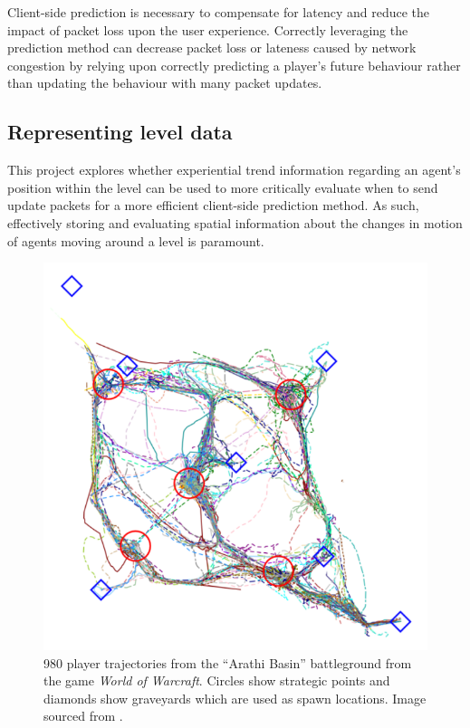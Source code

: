 \documentclass[journal]{IEEEtran}
\begin{document}
Client-side prediction is necessary to compensate for latency and reduce the impact of packet loss upon the user experience. Correctly leveraging the prediction method can decrease packet loss or lateness caused by network congestion by relying upon correctly predicting a player's future behaviour rather than updating the behaviour with many packet updates.

\subsection{Representing level data} \label{representingLevelData}

This project explores whether experiential trend information regarding an agent's position within the level can be used to more critically evaluate when to send update packets for a more efficient client-side prediction method. As such, effectively storing and evaluating spatial information about the changes in motion of agents moving around a level is paramount. 

\begin{figure}[h]
    \centering
    \includegraphics[width=0.9\linewidth]{Heatmap3.png}
    \caption{980 player trajectories from the ``Arathi Basin'' battleground from the game \textit{World of Warcraft}. Circles show strategic points and diamonds show graveyards which are used as spawn locations. Image sourced from \cite{miller2009avatar}.}
    \label{fig:hm3}
\end{figure}
\end{document}
